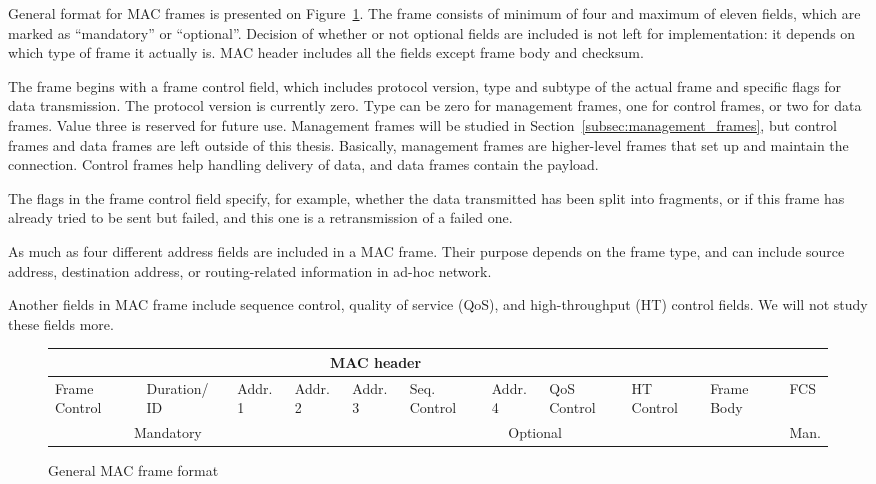 \documentclass[12pt,a4paper,oneside,pdftex]{report}
\begin{document}
General format for MAC frames is presented on Figure~\ref{fig:general_mac_frame}. The frame consists of minimum of four and maximum of eleven fields, which are marked as ``mandatory'' or ``optional''. Decision of whether or not optional fields are included is not left for implementation: it depends on which type of frame it actually is. MAC header includes all the fields except frame body and checksum.

The frame begins with a frame control field, which includes protocol version, type and subtype of the actual frame and specific flags for data transmission. The protocol version is currently zero. Type can be zero for management frames, one for control frames, or two for data frames. Value three is reserved for future use. Management frames will be studied in Section~\ref{subsec:management_frames}, but control frames and data frames are left outside of this thesis. Basically, management frames are higher-level frames that set up and maintain the connection. Control frames help handling delivery of data, and data frames contain the payload.

The flags in the frame control field specify, for example, whether the data transmitted has been split into fragments, or if this frame has already tried to be sent but failed, and this one is a retransmission of a failed one.

As much as four different address fields are included in a MAC frame. Their purpose depends on the frame type, and can include source address, destination address, or routing-related information in ad-hoc network.

Another fields in MAC frame include sequence control, quality of service (QoS), and high-throughput (HT) control fields. We will not study these fields more.

\begin{figure}
    \label{fig:general_mac_frame}
    \begin{tabular}{|p{1cm}|p{1cm}|p{1cm}|p{1cm}|p{1cm}|p{1cm}|p{1cm}|p{1cm}|p{1cm}|p{1cm}|p{0.8cm}|}
    
        \multicolumn{9}{|c|}{MAC header} &
        \multicolumn{2}{c|}{ } \\
    \hline 
        Frame Control &
        Dura\-tion/ ID &
        Addr. 1 &
        Addr. 2 &
        Addr. 3 &
        Seq. Control &
        Addr. 4 &
        QoS Control &
        HT Control &
        Frame Body &
        FCS \\
    \hline 
        \multicolumn{3}{|c|}{Mandatory} &
        \multicolumn{7}{c|}{Optional} &
        Man. \\

    \end{tabular}

    \caption{General MAC frame format}
\end{figure}
\end{document}
